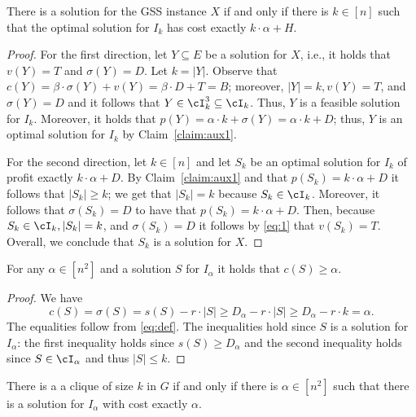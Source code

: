 {{	\begin{claim}
		\label{claim:iff}
		There is a solution for the \textnormal{GSS} instance $X$ if and only if there is $k \in [n]$ such that the optimal solution for $I_k$ has cost exactly $k \cdot \alpha+H$. 
	\end{claim}
	
	\begin{proof}
		For the first direction, let $Y \subseteq E$ be a solution for $X$, i.e., it holds that $v(Y) = T$ and $\sigma(Y) = D$. Let $k = |Y|$.  Observe that $c(Y) = \beta \cdot \sigma(Y) +v(Y) = \beta \cdot D+T = B$; moreover, $|Y| = k ,v(Y) = T$, and $\sigma(Y) = D$ and it follows that $Y \in \cI^3_k \subseteq \cI_k$. Thus, $Y$ is a feasible solution for $I_k$. Moreover, it holds that $p(Y) = \alpha \cdot k+\sigma(Y) = \alpha \cdot k+D$; thus, $Y$ is an optimal solution for $I_k$ by Claim~\ref{claim:aux1}. 
		
		For the second direction, let  $k \in [n]$ and let $S_k$ be an optimal solution for $I_k$ of profit exactly $k \cdot \alpha+D$. By Claim~\ref{claim:aux1} and that $p(S_k) = k \cdot \alpha +D$ it follows that $|S_k| \geq k$; we get that $|S_k| = k$ because $S_k \in \cI_k$. Moreover, it follows that $\sigma(S_k) = D$ to have that $p(S_k) = k \cdot \alpha +D$. Then, because $S_k \in \cI_k, |S_k| = k$, and $\sigma(S_k) = D$ it follows by \eqref{eq:1} that $v(S_k) = T$. Overall, we conclude that $S_k$ is a solution for $X$. %
	\end{proof}
	
	
}

\begin{claim}
	\label{claim:alpha}
	For any $\alpha \in [n^2]$ and a solution $S$ for $I_{\alpha}$ it holds that $c(S) \geq \alpha$. 
\end{claim}

\begin{proof}
	We have
	$$c(S) = \sigma(S) = s(S)-r \cdot |S| \geq D_{\alpha} - r \cdot |S| \geq D_{\alpha} - r \cdot k = \alpha.$$ The equalities follow from \eqref{eq:def}. The inequalities hold since $S$ is a solution for $I_{\alpha}$: the first inequality holds since $s(S) \geq D_{\alpha}$ and the second inequality holds since $S \in \cI_{\alpha}$ and thus $|S| \leq k$. 
\end{proof}



\begin{claim}
	\label{claim:iff}
	There is a a clique of size $k$ in $G$ if and only if there is $\alpha \in [n^2]$ such that there is a solution for $I_{\alpha}$ with cost exactly $\alpha$. 
\end{claim}

}
